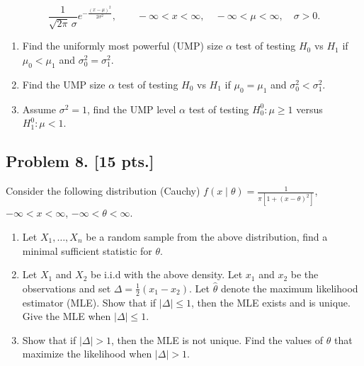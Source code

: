 \documentclass[11pt,a4paper]{article}
\begin{document}
\[
\frac{1}{\sqrt{2\pi}\,\sigma} e^{-\frac{(x-\mu)^2}{2\sigma^2}}, \qquad -\infty < x < \infty,\quad -\infty < \mu < \infty,\quad \sigma > 0.
\]

\begin{enumerate}[label=(\alph*)]
    \item Find the uniformly most powerful (UMP) size \( \alpha \) test of testing \( H_0 \) vs \( H_1 \) if \( \mu_0 < \mu_1 \) and \( \sigma_0^2 = \sigma_1^2 \).
    \item Find the UMP size \( \alpha \) test of testing \( H_0 \) vs \( H_1 \) if \( \mu_0 = \mu_1 \) and \( \sigma_0^2 < \sigma_1^2 \).
    \item Assume \( \sigma^2 = 1 \), find the UMP level \( \alpha \) test of testing \( H_{0}^{0} : \mu \ge 1 \) versus \( H_{1}^{0} : \mu < 1 \).
\end{enumerate}

\subsection{Problem 8. [15 pts.]}
Consider the following distribution (Cauchy) \( f(x \mid \theta) = \frac{1}{\pi[1+(x-\theta)^2]} \), \( -\infty < x < \infty \), \( -\infty < \theta < \infty \).
\begin{enumerate}[label=(\alph*)]
    \item Let \( X_1, \dots, X_n \) be a random sample from the above distribution, find a minimal sufficient statistic for \( \theta \).
    \item Let \( X_1 \) and \( X_2 \) be i.i.d with the above density. Let \( x_1 \) and \( x_2 \) be the observations and set \( \Delta = \frac{1}{2}(x_1 - x_2) \). Let \( \hat{\theta} \) denote the maximum likelihood estimator (MLE). Show that if \( |\Delta| \le 1 \), then the MLE exists and is unique. Give the MLE when \( |\Delta| \le 1 \).
    \item Show that if \( |\Delta| > 1 \), then the MLE is not unique. Find the values of \( \theta \) that maximize the likelihood when \( |\Delta| > 1 \).
\end{enumerate}
\end{document}
